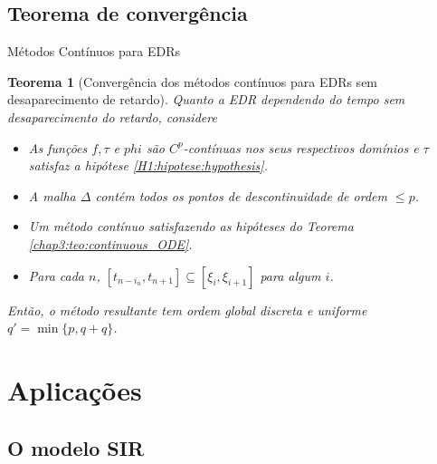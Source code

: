\documentclass{beamer}
\theoremstyle{plain}
\newtheorem{teo}{Teorema}
\theoremstyle{definition}
\begin{document}

\subsection{Teorema de convergência}

\begin{frame}{Métodos Contínuos para EDRs}
    \footnotesize
\begin{teo}[Convergência dos métodos contínuos para EDRs sem desaparecimento de retardo]
  \label{chap3:teo:DDE_method_1}
  Quanto a EDR dependendo do tempo sem desaparecimento do retardo, considere

  \begin{itemize}
      \item[$\bullet$] As funções $f, \tau$ e $phi$ são $C^p$-contínuas nos seus respectivos domínios e $\tau$ satisfaz a hipótese \ref{H1:hipotese:hypothesis}.

      \item[$\bullet$] A malha $\Delta$ contém todos os pontos de descontinuidade de ordem $\leq p$.

      \item[$\bullet$] Um método contínuo satisfazendo as hipóteses do Teorema \ref{chap3:teo:continuous_ODE}.

      \item[$\bullet$] Para cada $n$, $\left[t_{n-i_{n}}, t_{n+1}\right] \subseteq \left[\xi_{i}, \xi_{i+1}\right]$ para algum $i$.

  \end{itemize}

  Então, o método resultante tem ordem global discreta e uniforme $q' = \min\{p, q+q\}$.


\end{teo}
\end{frame}




\section{Aplicações}
\subsection{O modelo SIR}
\end{document}
